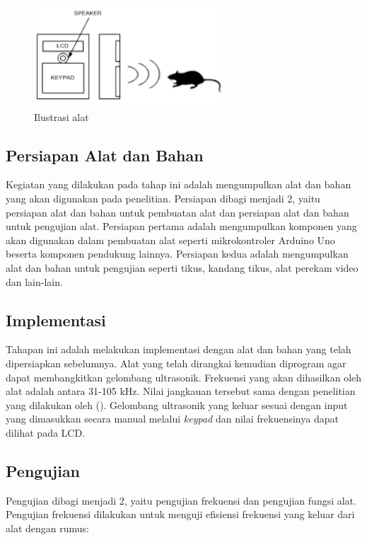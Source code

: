 \begin{figure}[h!]\centering %
\includegraphics[width=200pt]{kolokium_contoh_gb3.png}
\caption{Ilustrasi alat}
\label{fig:alat}
\end{figure}

\subsection*{Persiapan Alat dan Bahan}

Kegiatan yang dilakukan pada tahap ini adalah mengumpulkan alat dan bahan yang akan digunakan pada penelitian. Persiapan dibagi menjadi 2, yaitu persiapan alat dan bahan untuk pembuatan alat dan persiapan alat dan bahan untuk pengujian alat. Persiapan pertama adalah mengumpulkan komponen yang akan digunakan dalam pembuatan alat seperti mikrokontroler Arduino Uno beserta komponen pendukung lainnya. Persiapan kedua adalah mengumpulkan alat dan bahan untuk pengujian seperti tikus, kandang tikus, alat perekam video dan lain-lain.

\subsection*{Implementasi}

Tahapan ini adalah melakukan implementasi dengan alat dan bahan yang telah dipersiapkan sebelumnya. Alat yang telah dirangkai kemudian diprogram agar dapat membangkitkan gelombang ultrasonik. Frekuensi yang akan dihasilkan oleh alat adalah antara 31-105 kHz. Nilai jangkauan tersebut sama dengan penelitian yang dilakukan oleh \citeauthor{SIMEON2013} (\cite*{SIMEON2013}). Gelombang ultrasonik yang keluar sesuai dengan input yang dimasukkan secara manual melalui \textit{keypad} dan nilai frekuensinya dapat dilihat pada LCD.

\subsection*{Pengujian}

Pengujian dibagi menjadi 2, yaitu pengujian frekuensi dan pengujian fungsi alat. Pengujian frekuensi dilakukan untuk menguji efisiensi frekuensi yang keluar dari alat dengan rumus:

